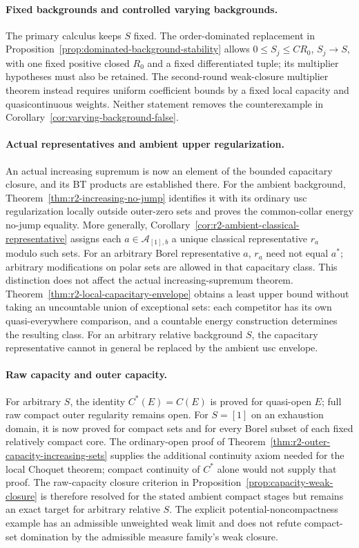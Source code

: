 \documentclass[11pt,a4paper]{article}
\numberwithin{equation}{section}
\theoremstyle{definition}
\theoremstyle{remark}
\begin{document}
\paragraph{Fixed backgrounds and controlled varying backgrounds.}
The primary calculus keeps $S$ fixed. The order-dominated replacement
in Proposition~\ref{prop:dominated-background-stability} allows
$0\leq S_j\leq C R_0$, $S_j\to S$, with one fixed positive closed
$R_0$ and a fixed differentiated tuple; its multiplier hypotheses
must also be retained. The second-round weak-closure multiplier
theorem instead requires uniform coefficient bounds by a fixed local
capacity and quasicontinuous weights. Neither statement removes the
counterexample in Corollary~\ref{cor:varying-background-false}.

\paragraph{Actual representatives and ambient upper regularization.}
An actual increasing supremum is now an element of the bounded
capacitary closure, and its BT products are established there. For the
ambient background, Theorem~\ref{thm:r2-increasing-no-jump} identifies
it with its ordinary usc regularization locally outside outer-zero
sets and proves the common-collar energy no-jump equality. More
generally, Corollary~\ref{cor:r2-ambient-classical-representative}
assigns each $a\in\mathcal A_{[1],b}$ a unique classical representative
$r_a$ modulo such sets. For an arbitrary Borel representative $a$,
$r_a$ need not equal $a^*$; arbitrary modifications on polar sets are
allowed in that capacitary class. This distinction does not affect
the actual increasing-supremum theorem.
Theorem~\ref{thm:r2-local-capacitary-envelope} obtains a least upper
bound without taking an uncountable union of exceptional sets: each
competitor has its own quasi-everywhere comparison, and a countable
energy construction determines the resulting class. For an arbitrary
relative background $S$, the capacitary representative cannot in
general be replaced by the ambient usc envelope.

\paragraph{Raw capacity and outer capacity.}
For arbitrary $S$, the identity $C^*(E)=C(E)$ is proved for quasi-open
$E$; full raw compact outer regularity remains open. For $S=[1]$ on
an exhaustion domain, it is now proved for compact sets and for
every Borel subset of each fixed relatively compact core. The
ordinary-open proof of Theorem~\ref{thm:r2-outer-capacity-increasing-sets}
supplies the additional continuity axiom needed for the local
Choquet theorem; compact continuity of $C^*$ alone would not supply
that proof. The raw-capacity closure criterion in
Proposition~\ref{prop:capacity-weak-closure} is therefore resolved
for the stated ambient compact stages but remains an exact target
for arbitrary relative $S$. The explicit potential-noncompactness
example has an admissible unweighted weak limit and does not refute
compact-set domination by the admissible measure family's weak closure.
\end{document}
